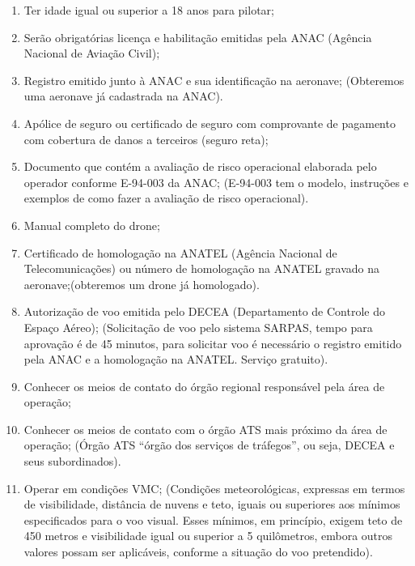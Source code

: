 \begin{enumerate}
    \item Ter idade igual ou superior a 18 anos para pilotar;
    \item Serão obrigatórias licença e habilitação emitidas pela ANAC (Agência Nacional de Aviação Civil);
    \item Registro emitido junto à ANAC e sua identificação na aeronave; (Obteremos uma aeronave já cadastrada na ANAC).
    \item Apólice de seguro ou certificado de seguro com comprovante de pagamento com cobertura de danos a terceiros (seguro reta);
    \item Documento que contém a avaliação de risco operacional elaborada pelo operador conforme E-94-003 da ANAC; (E-94-003 tem o modelo, instruções e exemplos de como fazer a avaliação de risco operacional).
    \item Manual completo do drone;
    \item Certificado de homologação na ANATEL (Agência Nacional de Telecomunicações) ou número de homologação na ANATEL gravado na aeronave;(obteremos um drone já homologado).
    \item Autorização de voo emitida pelo DECEA (Departamento de Controle do Espaço Aéreo); (Solicitação de voo pelo sistema SARPAS, tempo para aprovação é de 45 minutos, para solicitar voo é necessário o registro emitido pela ANAC e a homologação na ANATEL. Serviço gratuito).
    \item Conhecer os meios de contato do órgão regional responsável pela área de operação;
    \item Conhecer os meios de contato com o órgão ATS mais próximo da área de operação; (Órgão ATS “órgão dos serviços de tráfegos”, ou seja, DECEA e seus subordinados).
    \item Operar em condições VMC; (Condições meteorológicas, expressas em termos de visibilidade, distância de nuvens e teto, iguais ou superiores aos mínimos especificados para o voo visual. Esses mínimos, em princípio, exigem teto de 450 metros e visibilidade igual ou superior a 5 quilômetros, embora outros valores possam ser aplicáveis, conforme a situação do voo pretendido).
    

\end{enumerate}
